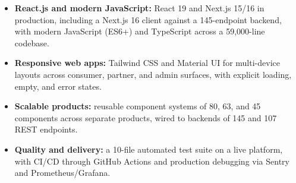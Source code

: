 \documentclass[]{cover}
\begin{document}


\currentdate{\today}



{\raggedright{}\fontsize{11pt}{13pt}\selectfont
\renewcommand{\labelitemi}{\textbullet}
\renewcommand{\labelitemii}{\textbullet}
\renewcommand{\labelitemiii}{\textbullet}
\begin{itemize}
    \item {\textbf{React.js and modern JavaScript:} React 19 and Next.js 15/16 in production, including a Next.js 16 client against a 145-endpoint backend, with modern JavaScript (ES6+) and TypeScript across a 59,000-line codebase.}
    \item {\textbf{Responsive web apps:} Tailwind CSS and Material UI for multi-device layouts across consumer, partner, and admin surfaces, with explicit loading, empty, and error states.}
    \item {\textbf{Scalable products:} reusable component systems of 80, 63, and 45 components across separate products, wired to backends of 145 and 107 REST endpoints.}
    \item {\textbf{Quality and delivery:} a 10-file automated test suite on a live platform, with CI/CD through GitHub Actions and production debugging via Sentry and Prometheus/Grafana.}
\end{itemize}\par}
\vspace{6pt}
\end{document}
